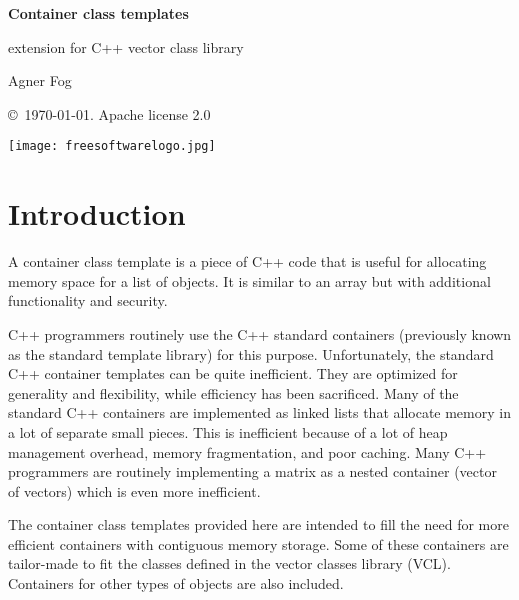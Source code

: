 \documentclass[11pt,a4paper,oneside,openright]{report}
\newcommand{\vspacesmall}{\vspace{3mm}}
\newcommand{\vspacebig}{\vspace{6mm}}
\begin{document}
\begin{titlepage}
    \centering
   
    \null %
    \vfill

   {\bfseries\Huge
    Container class templates
    \vspacesmall
        
    extension for C++ vector class library 
    \vspacebig
        
   }        
    \vspacebig
    
   {\Large    
    Agner Fog
    \vspacebig
    
    \copyright\ \today. Apache license 2.0
   }
    
    \vfill
    
    \texttt{[image: freesoftwarelogo.jpg]}
    \vfill
    
\end{titlepage}

\RaggedRight

\chapter{Introduction}\label{chap:Introduction}

A container class template is a piece of C++ code that is useful for allocating memory space for a list of objects. It is similar to an array but with additional functionality and security.
\vspacesmall

C++ programmers routinely use the C++ standard containers (previously known as the standard template library) for this purpose. Unfortunately, the standard 
C++ container templates can be quite inefficient. They are optimized for generality and flexibility, while efficiency has been sacrificed. Many of the standard C++ containers are implemented as linked lists that allocate memory in a lot of separate small pieces. This is inefficient because of a lot of heap management overhead, memory fragmentation, and poor caching. Many C++ programmers are routinely implementing a matrix as a nested container (vector of vectors) which is even more inefficient.
\vspacesmall

The container class templates provided here are intended to fill the need for more efficient containers with contiguous memory storage. Some of these containers are tailor-made to fit the classes defined in the vector classes library (VCL). Containers for other types of objects are also included.
\vspacesmall
\end{document}
